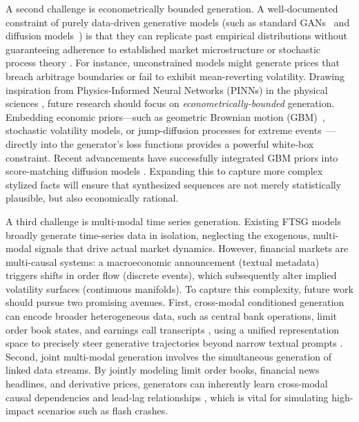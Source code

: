 \documentclass[11pt,a4paper]{article}
\providecommand{\DIFaddbegin}{} %
\providecommand{\DIFaddend}{} %
\providecommand{\DIFdelbegin}{} %
\providecommand{\DIFdelend}{} %
\providecommand{\DIFscaledelfig}{0.5}
\newlength{\DIFdelgraphicswidth} %
\newlength{\DIFdelgraphicsheight} %
\providecommand{\DIFaddincludegraphics}[2][]{{\color{blue}\fbox{\DIFOincludegraphics[#1]{#2}}}} %
\providecommand{\DIFdelincludegraphics}[2][]{%
\sbox{\DIFdelgraphicsbox}{\DIFOincludegraphics[#1]{#2}}%
\settoboxwidth{\DIFdelgraphicswidth}{\DIFdelgraphicsbox} %
\settoboxtotalheight{\DIFdelgraphicsheight}{\DIFdelgraphicsbox} %
\scalebox{\DIFscaledelfig}{%
\parbox[b]{\DIFdelgraphicswidth}{\usebox{\DIFdelgraphicsbox}\\[-\baselineskip] \rule{\DIFdelgraphicswidth}{0em}}\llap{\resizebox{\DIFdelgraphicswidth}{\DIFdelgraphicsheight}{%
\setlength{\unitlength}{\DIFdelgraphicswidth}%
\begin{picture}(1,1)%
\thicklines\linethickness{2pt} %
{\color[rgb]{1,0,0}\put(0,0){\framebox(1,1){}}}%
{\color[rgb]{1,0,0}\put(0,0){\line( 1,1){1}}}%
{\color[rgb]{1,0,0}\put(0,1){\line(1,-1){1}}}%
\end{picture}%
}\hspace*{3pt}}} %
} %
\DeclareRobustCommand{\DIFaddbegin}{\DIFOaddbegin \let\includegraphics\DIFaddincludegraphics} %
\DeclareRobustCommand{\DIFaddend}{\DIFOaddend \let\includegraphics\DIFOincludegraphics} %
\DeclareRobustCommand{\DIFdelbegin}{\DIFOdelbegin \let\includegraphics\DIFdelincludegraphics} %
\DeclareRobustCommand{\DIFdelend}{\DIFOaddend \let\includegraphics\DIFOincludegraphics} %
\begin{document}
A second challenge is econometrically bounded generation. A well-documented constraint of purely data-driven generative models (such as standard GANs~\citep{goodfellow2014gan} and diffusion models~\citep{ho2020ddpm,song2021score}) is that they can replicate past empirical distributions without guaranteeing adherence to established market microstructure or stochastic process theory \citep{cont2001empirical}. For instance, unconstrained models might generate prices that breach arbitrage boundaries or fail to exhibit mean-reverting volatility.
Drawing inspiration from Physics-Informed Neural Networks (PINNs) in the physical sciences \citep{raissi2019physics}, future research should focus on \textit{econometrically-bounded} generation. Embedding economic priors---such as geometric Brownian motion (GBM)~\citep{black1973pricing}, stochastic volatility models, or jump-diffusion processes for extreme events~\citep{merton1976option}---directly into the generator's loss functions provides a powerful white-box constraint. Recent advancements have successfully integrated GBM priors into score-matching diffusion models \citep{tanaka2025cofindiff}. Expanding this to capture more complex stylized facts will ensure that synthesized sequences are not merely statistically plausible, but also economically rational.

A third challenge is multi-modal time series generation. Existing FTSG models broadly generate time-series data in isolation, neglecting the exogenous, multi-modal signals that drive actual market dynamics. However, financial markets are multi-causal systems: a macroeconomic announcement (textual metadata) triggers shifts in order flow (discrete events), which subsequently alter implied volatility surfaces (continuous manifolds). To capture this complexity, future work should pursue two promising avenues. First, cross-modal conditioned generation can encode broader heterogeneous data, such as central bank operations, limit order book states, and earnings call transcripts \DIFdelbegin %
\DIFdelend \DIFaddbegin \cite{T2S, wang2024mtsisurvey}\DIFaddend , using a unified representation space to precisely steer generative trajectories beyond narrow textual prompts \DIFdelbegin %
\DIFdelend \DIFaddbegin \cite{jin2024timellm, liu2025calf}\DIFaddend . Second, joint multi-modal generation involves the simultaneous generation of linked data streams. By jointly modeling limit order books, financial news headlines, and derivative prices, generators can inherently learn cross-modal causal dependencies and lead-lag relationships \DIFdelbegin %
\DIFdelend \DIFaddbegin \cite{T2S}\DIFaddend , which is vital for simulating high-impact scenarios such as flash crashes.
\end{document}
